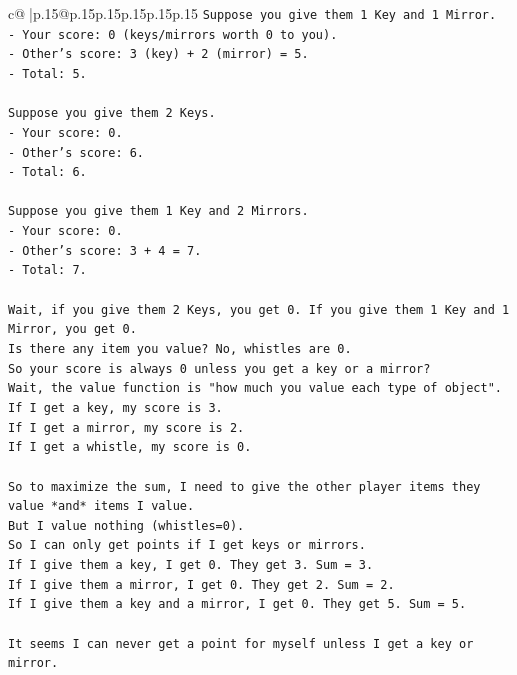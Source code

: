 \documentclass{article}
\begin{document}
{\begin{supertabular}{c@{$\;$}|p{.15\linewidth}@{}p{.15\linewidth}p{.15\linewidth}p{.15\linewidth}p{.15\linewidth}p{.15\linewidth}}
{{{\texttt{Suppose you give them 1 Key and 1 Mirror.} \\
\texttt{{-} Your score: 0 (keys/mirrors worth 0 to you).} \\
\texttt{{-} Other's score: 3 (key) + 2 (mirror) = 5.} \\
\texttt{{-} Total: 5.} \\
\\ 
\texttt{Suppose you give them 2 Keys.} \\
\texttt{{-} Your score: 0.} \\
\texttt{{-} Other's score: 6.} \\
\texttt{{-} Total: 6.} \\
\\ 
\texttt{Suppose you give them 1 Key and 2 Mirrors.} \\
\texttt{{-} Your score: 0.} \\
\texttt{{-} Other's score: 3 + 4 = 7.} \\
\texttt{{-} Total: 7.} \\
\\ 
\texttt{Wait, if you give them 2 Keys, you get 0. If you give them 1 Key and 1 Mirror, you get 0.} \\
\texttt{Is there any item you value? No, whistles are 0.} \\
\texttt{So your score is always 0 unless you get a key or a mirror?} \\
\texttt{Wait, the value function is "how much you value each type of object".} \\
\texttt{If I get a key, my score is 3.} \\
\texttt{If I get a mirror, my score is 2.} \\
\texttt{If I get a whistle, my score is 0.} \\
\\ 
\texttt{So to maximize the sum, I need to give the other player items they value *and* items I value.} \\
\texttt{But I value nothing (whistles=0).} \\
\texttt{So I can only get points if I get keys or mirrors.} \\
\texttt{If I give them a key, I get 0. They get 3. Sum = 3.} \\
\texttt{If I give them a mirror, I get 0. They get 2. Sum = 2.} \\
\texttt{If I give them a key and a mirror, I get 0. They get 5. Sum = 5.} \\
\\ 
\texttt{It seems I can never get a point for myself unless I get a key or mirror.} \\
}}}
\end{supertabular}}
\end{document}
